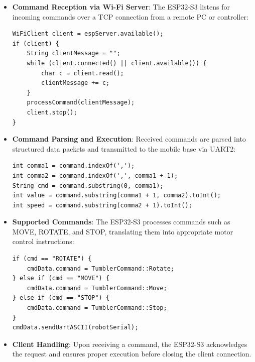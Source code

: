 \begin{itemize}
	\item \textbf{Command Reception via Wi-Fi Server}: The ESP32-S3 listens for incoming commands over a TCP connection from a remote PC or controller:
\begin{lstlisting}[style=cppstyle2]
WiFiClient client = espServer.available();
if (client) {
	String clientMessage = "";
	while (client.connected() || client.available()) {
		char c = client.read();
		clientMessage += c;
	}
	processCommand(clientMessage);
	client.stop();
}
\end{lstlisting}
	\item \textbf{Command Parsing and Execution}: Received commands are parsed into structured data packets and transmitted to the mobile base via UART2:
\begin{lstlisting}[style=cppstyle2]
int comma1 = command.indexOf(',');
int comma2 = command.indexOf(',', comma1 + 1);
String cmd = command.substring(0, comma1);
int value = command.substring(comma1 + 1, comma2).toInt();
int speed = command.substring(comma2 + 1).toInt();
\end{lstlisting}
	\item \textbf{Supported Commands}: The ESP32-S3 processes commands such as MOVE, ROTATE, and STOP, translating them into appropriate motor control instructions:
\begin{lstlisting}[style=cppstyle2]
if (cmd == "ROTATE") {
	cmdData.command = TumblerCommand::Rotate;
} else if (cmd == "MOVE") {
	cmdData.command = TumblerCommand::Move;
} else if (cmd == "STOP") {
	cmdData.command = TumblerCommand::Stop;
}
cmdData.sendUartASCII(robotSerial);
\end{lstlisting}
	\item \textbf{Client Handling}: Upon receiving a command, the ESP32-S3 acknowledges the request and ensures proper execution before closing the client connection.
\end{itemize}

